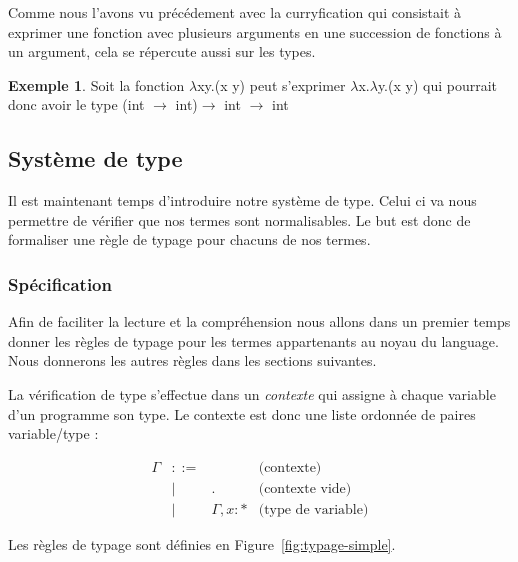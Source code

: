 \documentclass {article}
\theoremstyle{definition}
\newtheorem{example}{Exemple}
\theoremstyle{remark}
\newenvironment{bnf}
               {\[\begin{array}{lclr}}
               {\end{array}\]}
\begin{document}
Comme nous l'avons vu précédement avec la curryfication qui consistait à exprimer une 
fonction avec plusieurs arguments en une succession de fonctions à un argument, cela 
se répercute aussi sur les types.

\begin{example}
  Soit la fonction \(\lambda\)x\:y.(x y) peut s'exprimer 
  \(\lambda\)x.\(\lambda\)y.(x y) qui pourrait donc avoir 
  le type (int \(\rightarrow\) int)\(\rightarrow\) int \(\rightarrow\) int
\end{example}

\subsection{Système de type}

Il est maintenant temps d'introduire notre système de type. Celui ci va nous permettre de vérifier que nos termes 
sont normalisables. Le but est donc de formaliser une règle de typage pour chacuns de nos termes.

\subsubsection{Spécification}

Afin de faciliter la lecture et la compréhension nous allons dans 
un premier temps donner les règles de typage pour les termes appartenants au noyau 
du language. Nous donnerons les autres règles dans les sections suivantes.

La vérification de type s'effectue dans un \emph{contexte} qui assigne
à chaque variable d'un programme son type. Le contexte est donc une
liste ordonnée de paires variable/type :
%

\begin{bnf}
  \Gamma &::=& &\mbox{(contexte)} \\
         &|& . & \mbox{(contexte vide)} \\
         &|& \Gamma, x : * & \mbox{(type de variable)} 
\end{bnf}


Les règles de typage sont définies en Figure~\ref{fig:typage-simple}.
\end{document}
